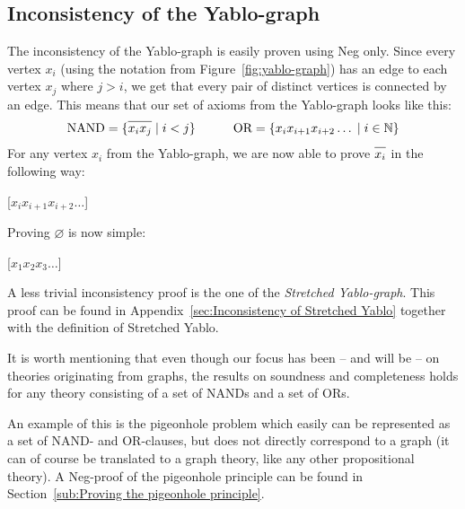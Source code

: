 \subsection{Inconsistency of the Yablo-graph}
\label{sub:Inconsistency of the Yablo-graph}
The inconsistency of the Yablo-graph is easily proven using Neg only.
Since every vertex $x_i$ (using the notation from Figure~\ref{fig:yablo-graph}) has an edge to each vertex $x_j$ where $j > i$, we get that every pair of distinct vertices is connected by an edge.
This means that our set of axioms from the Yablo-graph looks like this:
\begin{align}
  \text{NAND} = \{ \ol{x_ix_j} \; |\; i < j\}
  \quad\quad\quad
  \text{OR} = \{ x_ix_{i+1}x_{i+2}\dots \; |\; i \in \mathbb{N}\}
\end{align}
For any vertex $x_i$ from the Yablo-graph, we are now able to prove $\ol{x_i}$ in the following way:
\begin{prooftree*}
  \Hypo{\dots}
  [$x_ix_{i+1}x_{i+2}\dots$]{}
\end{prooftree*}
Proving $\varnothing$ is now simple:
\begin{prooftree*}
  \Hypo{\dots}
  \Hypo{\dots}
  \Hypo{\dots}
  \Hypo{\dots}
  [$x_1x_2x_3\dots$]{\varnothing}
\end{prooftree*}
A less trivial inconsistency proof is the one of the \textit{Stretched Yablo-graph}.
This proof can be found in Appendix~\ref{sec:Inconsistency of Stretched Yablo} together with the definition of Stretched Yablo.

It is worth mentioning that even though our focus has been -- and will be -- on theories originating from graphs, the results on soundness and completeness holds for any theory consisting of a set of NANDs and a set of ORs.

An example of this is the pigeonhole problem which easily can be represented as a set of NAND- and OR-clauses, but does not directly correspond to a graph (it can of course be translated to a graph theory, like any other propositional theory).
A Neg-proof of the pigeonhole principle can be found in Section~\ref{sub:Proving the pigeonhole principle}.
